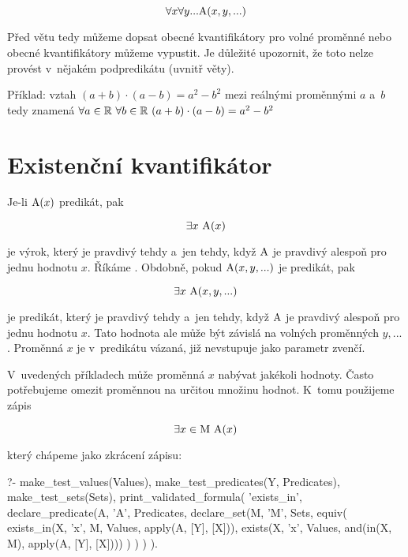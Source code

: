 \begin{equation}
\forall x \forall y ... \mathrm{A}(x, y, ...)
\end{equation}

Před větu tedy můžeme dopsat obecné kvantifikátory pro volné proměnné nebo  obecné kvantifikátory můžeme vypustit. Je důležité upozornit, že toto nelze provést v~nějakém podpredikátu (uvnitř věty).

Příklad: vztah \((a + b) \cdot (a - b) = a^2 - b^2\) mezi reálnými proměnnými \(a\) a~\(b\) tedy znamená \(\forall a \in \mathbb{R} \ \forall b \in \mathbb{R} \ (a + b) \cdot (a - b) = a^2 - b^2\)

\section{Existenční kvantifikátor}

Je-li \(\mathrm{A}(x)\) predikát, pak

\begin{equation}
\exists x \ \predicate{A}(x)
\end{equation}

je výrok, který je pravdivý tehdy a~jen tehdy, když \(\mathrm{A}\) je pravdivý alespoň pro jednu hodnotu \(x\). Říkáme . Obdobně, pokud \(\mathrm{A}(x, y, ...)\) je predikát, pak

\begin{equation}
\exists x \ \mathrm{A}(x, y, ...)
\end{equation}

je predikát, který je pravdivý tehdy a~jen tehdy, když \(\mathrm{A}\) je pravdivý alespoň pro jednu hodnotu \(x\). Tato hodnota ale může být závislá na volných proměnných \(y, ...\). Proměnná \(x\) je v~predikátu vázaná, již nevstupuje jako parametr zvenčí.

V~uvedených příkladech může proměnná \(x\) nabývat jakékoli hodnoty. Často potřebujeme omezit proměnnou na určitou množinu hodnot. K~tomu použijeme zápis

\begin{equation}
\exists x \in \mathrm{M} \ \predicate{A}(x)
\end{equation}

který chápeme jako zkrácení zápisu:

\begin{prolog}
?- 	make_test_values(Values),
	make_test_predicates(Y, Predicates),
	make_test_sets(Sets),
	print_validated_formula(
		'exists_in',
		declare_predicate(A, 'A', Predicates,
			declare_set(M, 'M', Sets,
				equiv(
					exists_in(X, 'x', M, Values, apply(A, [Y], [X])),
					exists(X, 'x', Values, and(in(X, M), apply(A, [Y], [X])))
				)
			)
		)
	).
\end{prolog}

